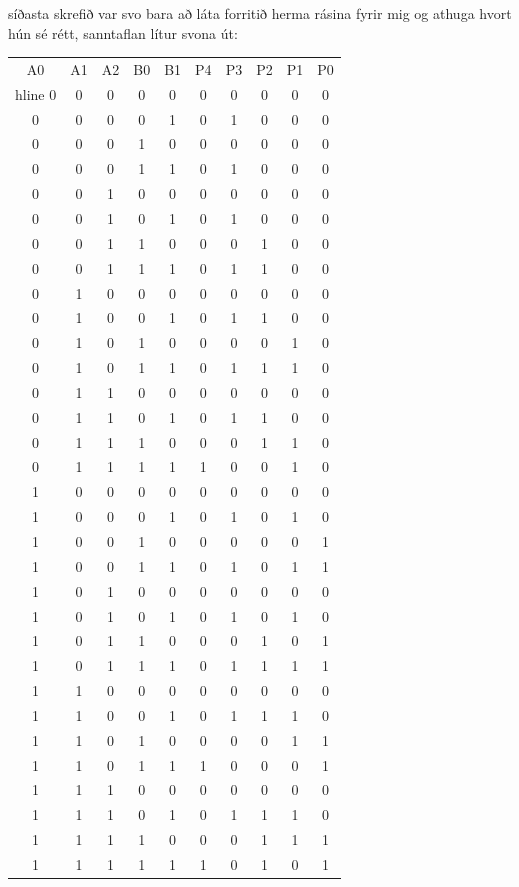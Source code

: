 \documentclass{article}
\begin{document}
síðasta skrefið var svo bara að láta forritið herma rásina fyrir mig og athuga hvort hún sé rétt, sanntaflan lítur svona út:
\begin{center}
    \begin{tabular}{|c|c|c|c|c|c|c|c|c|c|}
    A0&A1&A2&B0&B1&P4&P3&P2&P1&P0\\
    hline
0&0&0&0&0&0&0&0&0&0\\
\hline
0&0&0&0&1&0&1&0&0&0\\
\hline
0&0&0&1&0&0&0&0&0&0\\
\hline
0&0&0&1&1&0&1&0&0&0\\
\hline
0&0&1&0&0&0&0&0&0&0\\
\hline
0&0&1&0&1&0&1&0&0&0\\
\hline
0&0&1&1&0&0&0&1&0&0\\
\hline
0&0&1&1&1&0&1&1&0&0\\
\hline
0&1&0&0&0&0&0&0&0&0\\
\hline
0&1&0&0&1&0&1&1&0&0\\
\hline
0&1&0&1&0&0&0&0&1&0\\
\hline
0&1&0&1&1&0&1&1&1&0\\
\hline
0&1&1&0&0&0&0&0&0&0\\
\hline
0&1&1&0&1&0&1&1&0&0\\
\hline
0&1&1&1&0&0&0&1&1&0\\
\hline
0&1&1&1&1&1&0&0&1&0\\
\hline
1&0&0&0&0&0&0&0&0&0\\
\hline
1&0&0&0&1&0&1&0&1&0\\
\hline
1&0&0&1&0&0&0&0&0&1\\
\hline
1&0&0&1&1&0&1&0&1&1\\
\hline
1&0&1&0&0&0&0&0&0&0\\
\hline
1&0&1&0&1&0&1&0&1&0\\
\hline
1&0&1&1&0&0&0&1&0&1\\
\hline
1&0&1&1&1&0&1&1&1&1\\
\hline
1&1&0&0&0&0&0&0&0&0\\
\hline
1&1&0&0&1&0&1&1&1&0\\
\hline
1&1&0&1&0&0&0&0&1&1\\
\hline
1&1&0&1&1&1&0&0&0&1\\
\hline
1&1&1&0&0&0&0&0&0&0\\
\hline
1&1&1&0&1&0&1&1&1&0\\
\hline
1&1&1&1&0&0&0&1&1&1\\
\hline
1&1&1&1&1&1&0&1&0&1\\
\hline
    \end{tabular}
\end{center}
\end{document}
